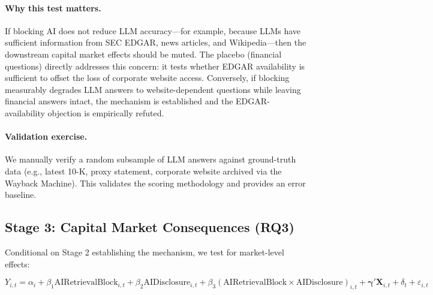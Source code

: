 \documentclass[12pt,a4paper]{article}
\begin{document}
\paragraph{Why this test matters.} If blocking AI does not reduce LLM accuracy---for example, because LLMs have sufficient information from SEC EDGAR, news articles, and Wikipedia---then the downstream capital market effects should be muted. The placebo (financial questions) directly addresses this concern: it tests whether EDGAR availability is sufficient to offset the loss of corporate website access. Conversely, if blocking measurably degrades LLM answers to website-dependent questions while leaving financial answers intact, the mechanism is established and the EDGAR-availability objection is empirically refuted.

\paragraph{Validation exercise.} We manually verify a random subsample of LLM answers against ground-truth data (e.g., latest 10-K, proxy statement, corporate website archived via the Wayback Machine). This validates the scoring methodology and provides an error baseline.

\subsection{Stage 3: Capital Market Consequences (RQ3)}

Conditional on Stage 2 establishing the mechanism, we test for market-level effects:

\begin{equation}
Y_{i,t} = \alpha_i + \beta_1 \text{AIRetrievalBlock}_{i,t} + \beta_2 \text{AIDisclosure}_{i,t} + \beta_3 (\text{AIRetrievalBlock} \times \text{AIDisclosure})_{i,t} + \boldsymbol{\gamma}' \mathbf{X}_{i,t} + \delta_t + \varepsilon_{i,t}
\label{eq:main}
\end{equation}
\end{document}
